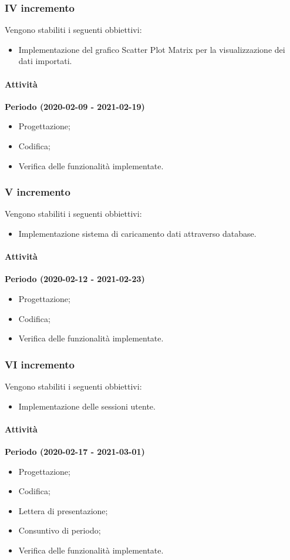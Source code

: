\documentclass[../piano_di_progetto.tex]{subfiles}
\begin{document}
\subsubsection{IV incremento}
Vengono stabiliti i seguenti obbiettivi:
\begin{itemize}
    \item Implementazione del grafico Scatter Plot Matrix per la visualizzazione dei dati importati.
\end{itemize}
\paragraph{Attività}
\noindent\textbf{Periodo (2020-02-09 - 2021-02-19)}
\begin{itemize}
    \item Progettazione;
    \item Codifica;
    \item Verifica delle funzionalità implementate.
\end{itemize}

\subsubsection{V incremento}
Vengono stabiliti i seguenti obbiettivi:
\begin{itemize}
    \item Implementazione sistema di caricamento dati attraverso database.
\end{itemize}
\paragraph{Attività}
\noindent\textbf{Periodo (2020-02-12 - 2021-02-23)}
\begin{itemize}
    \item Progettazione;
    \item Codifica;
    \item Verifica delle funzionalità implementate.
\end{itemize}

\subsubsection{VI incremento}
Vengono stabiliti i seguenti obbiettivi:
\begin{itemize}
    \item Implementazione delle sessioni utente.
\end{itemize}
\paragraph{Attività}
\noindent\textbf{Periodo (2020-02-17 - 2021-03-01)}
\begin{itemize}
    \item Progettazione;
    \item Codifica;
    \item Lettera di presentazione;
    \item Consuntivo di periodo;
    \item Verifica delle funzionalità implementate.
\end{itemize}
\end{document}
